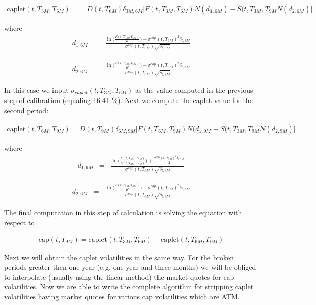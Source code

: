\documentclass[11pt]{article}
\numberwithin{equation}{subsection}
\begin{document}
\begin{eqnarray*}
	\text{caplet}(t, T_{3M}, T_{6M}) &=& D(t, T_{6M}) \delta_{3M,6M} \big[ F(t, T_{3M}, T_{6M}) N(d_{1,6M})
	- S(t, T_{3M}, T_{9M}N(d_{2,6M}) \big]
\end{eqnarray*}


where 
\begin{eqnarray*}
	d_{1,6M}&=&\frac{\ln\Big(\frac{F(t, T_{3M}, T_{6M})}{K}\Big) + \sigma^{cap}(t, T_{6M})^2\delta_{t, 3M}}{\sigma^{cap}(t, T_{6M})\sqrt{\delta_{t,3M}}}
\end{eqnarray*}

\begin{eqnarray*}
	d_{2,6M}&=&\frac{\ln\Big(\frac{F(t, T_{3M}, T_{6M})}{K}\Big) - \sigma^{cap}(t, T_{6M})^2\delta_{t, 3M}}{\sigma^{cap}(t, T_{6M})\sqrt{\delta_{t,3M}}}
\end{eqnarray*}


In this case we input \(\sigma_{caplet}(t, T_{3M}, T_{6M})\) as the value computed in the previous step
of calibration (equaling 16.41 \%). Next we compute the caplet value for the second
period:

\begin{eqnarray*}
	\text{caplet}(t, T_{6M}, T_{9M}) = D(t, T_{9M}) \delta_{6M,9M} \big[F(t, T_{6M}, T_{9M}) N(d_{1,9M} -  S(t, T_{3M}, T_{9M}N(d_{2,9M}) \big]
\end{eqnarray*}

where 
\begin{eqnarray*}
	d_{1,9M}&=&\frac{\ln\Big(\frac{F(t, T_{6M}, T_{9M})}{S(t, T_{3M}, T_{9M})}\Big) + \frac{\sigma^{cap}(t, T_{3M})^2 \delta_{t, 3M}}{2}}{\sigma^{cap}(t, T_{6M})\sqrt{\delta_{t,3M}}}
\end{eqnarray*}

\begin{eqnarray*}
	d_{2,6M}&=&\frac{\ln\Big(\frac{F(t, T_{3M}, T_{6M})}{K}\Big) - \sigma^{cap}(t, T_{6M})^2\delta_{t, 3M}}{\sigma^{cap}(t, T_{6M})\sqrt{\delta_{t,3M}}}
\end{eqnarray*}

The final computation in this step of calculation is solving the equation with respect to

\begin{eqnarray*}
	\text{cap}(t, T_{9M}) = \text{caplet}(t, T_{3M}, T_{6M}) + \text{caplet}(t, T_{6M}, T_{9M})
\end{eqnarray*}


Next we will obtain the caplet volatilities in the same way. For the broken periods greater
then one year (e.g. one year and three months) we will be obliged to interpolate (usually
using the linear method) the market quotes for cap volatilities.
Now we are able to write the complete algorithm for stripping caplet volatilities having
market quotes for various cap volatilities which are ATM.
\end{document}
